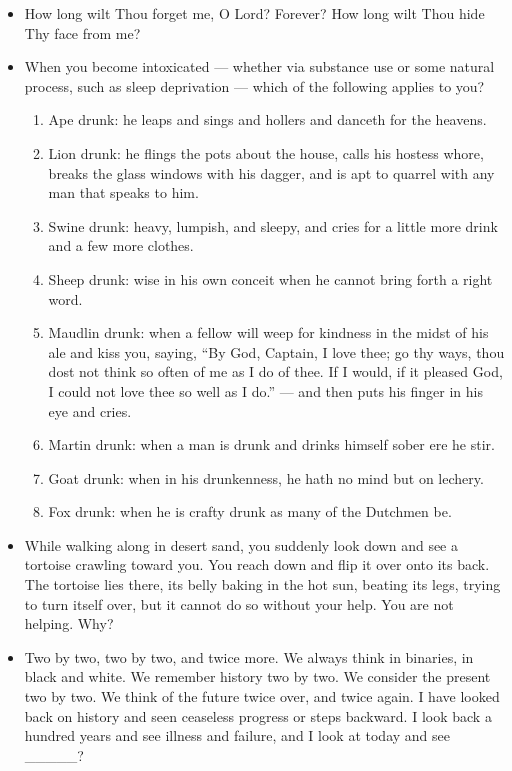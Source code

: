 \begin{itemize}
\tightlist
\item
  How long wilt Thou forget me, O Lord? Forever? How long wilt Thou hide Thy face from me?
\item
  When you become intoxicated — whether via substance use or some natural process, such as sleep deprivation — which of the following applies to you?

  \begin{enumerate}
  \def\labelenumi{\arabic{enumi}.}
  \tightlist
  \item
    Ape drunk: he leaps and sings and hollers and danceth for the heavens.
  \item
    Lion drunk: he flings the pots about the house, calls his hostess whore, breaks the glass windows with his dagger, and is apt to quarrel with any man that speaks to him.
  \item
    Swine drunk: heavy, lumpish, and sleepy, and cries for a little more drink and a few more clothes.
  \item
    Sheep drunk: wise in his own conceit when he cannot bring forth a right word.
  \item
    Maudlin drunk: when a fellow will weep for kindness in the midst of his ale and kiss you, saying, ``By God, Captain, I love thee; go thy ways, thou dost not think so often of me as I do of thee. If I would, if it pleased God, I could not love thee so well as I do.'' — and then puts his finger in his eye and cries.
  \item
    Martin drunk: when a man is drunk and drinks himself sober ere he stir.
  \item
    Goat drunk: when in his drunkenness, he hath no mind but on lechery.
  \item
    Fox drunk: when he is crafty drunk as many of the Dutchmen be.
  \end{enumerate}
\item
  While walking along in desert sand, you suddenly look down and see a tortoise crawling toward you. You reach down and flip it over onto its back. The tortoise lies there, its belly baking in the hot sun, beating its legs, trying to turn itself over, but it cannot do so without your help. You are not helping. Why?
\item
  Two by two, two by two, and twice more. We always think in binaries, in black and white. We remember history two by two. We consider the present two by two. We think of the future twice over, and twice again. I have looked back on history and seen ceaseless progress or steps backward. I look back a hundred years and see illness and failure, and I look at today and see \_\_\_\_\_?

\end{itemize}
